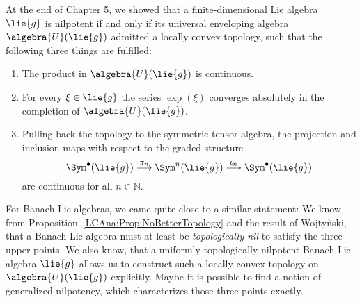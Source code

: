 At the end of Chapter 5, we showed that a finite-dimensional Lie algebra 
$\lie{g}$ is nilpotent if and only if its universal enveloping algebra 
$\algebra{U}(\lie{g})$ admitted a locally convex topology, such that the 
following three things are fulfilled:
\begin{enumerate}
	\item
	The product in $\algebra{U}(\lie{g})$ is continuous.

	\item
	For every $\xi \in \lie{g}$ the series $\exp(\xi)$ converges 
	absolutely in the completion of $\algebra{U}(\lie{g})$.

	\item
	Pulling back the topology to the symmetric tensor algebra, the projection 
	and inclusion maps with respect to the graded structure
	\begin{equation*}
		\Sym^{\bullet}(\lie{g})
    		\ot{$\pi_n$}{\longrightarrow}
   	    		\Sym^n(\lie{g})
    	    	\ot{$\iota_n$}{\longrightarrow}
    		\Sym^{\bullet}(\lie{g})
	\end{equation*}
	are continuous for all $n \in \mathbb{N}$.
\end{enumerate}
For Banach-Lie algebras, we came quite close to a similar statement: We know 
from Proposition~\ref{LCAna:Prop:NoBetterTopology} and the result of 
Wojty\`nski, that a Banach-Lie algebra must at least be \emph{topologically 
nil} to satisfy the three upper points. We also know, that a uniformly 
topologically nilpotent Banach-Lie algebra $\lie{g}$ allows us to construct 
such a locally convex topology on $\algebra{U}(\lie{g})$ explicitly. Maybe it 
is possible to find a notion of generalized nilpotency, which characterizes 
those three points exactly.
